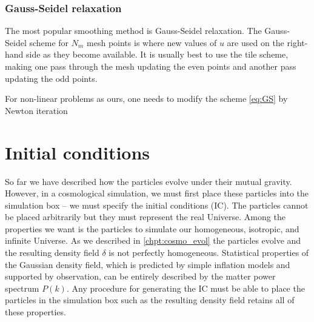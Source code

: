 \subsubsection{Gauss-Seidel relaxation}
The most popular smoothing method is Gauss-Seidel relaxation. The Gauss-Seidel scheme for $N_m$ mesh points is
where new values of $u$ are used on the right-hand side as they become available. It is usually best to use the tile scheme, making one pass through the mesh updating the even points and another pass updating the odd points.

For non-linear problems as ours, one needs to modify the scheme \eqref{eq:GS} by Newton iteration
\section{Initial conditions}
So far we have described how the particles evolve under their mutual gravity. However, in a cosmological simulation, we must first place these particles into the simulation box -- we must specify the initial conditions (IC). The particles cannot be placed arbitrarily but they must represent the real Universe. Among the properties we want is the particles to simulate our homogeneous, isotropic, and infinite Universe. As we described in \autoref{chpt:cosmo_evol} the particles evolve and the resulting density field $\delta$ is not perfectly homogeneous. Statistical properties of the Gaussian density field, which is predicted by simple inflation models and supported by observation, can be entirely described by the matter power spectrum $P(k)$. Any procedure for generating the IC must be able to place the particles in the simulation box such as the resulting density field retains all of these properties.


